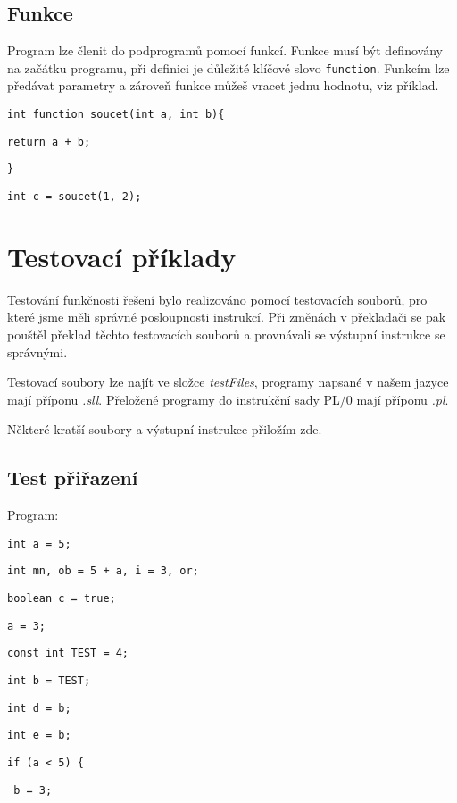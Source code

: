 \documentclass[czech]{thesiskiv}
\begin{document}
\section{Funkce}
Program lze členit do podprogramů pomocí funkcí.
Funkce musí být definovány na začátku programu, při definici je důležité klíčové slovo
\texttt{function}. Funkcím lze předávat parametry a zároveň funkce můžeš vracet jednu hodnotu, viz příklad.


\texttt{int function soucet(int a, int b)\{}

\texttt{return a + b;}

\texttt{\}}


\texttt{int c = soucet(1, 2);}

               
\chapter{Testovací příklady}
Testování funkčnosti řešení bylo realizováno pomocí testovacích souborů, pro které jsme měli správné posloupnosti instrukcí.
Při změnách v překladači se pak pouštěl překlad těchto testovacích souborů a provnávali se výstupní instrukce se správnými.

\noindent Testovací soubory lze najít ve složce \textit{testFiles}, programy napsané v našem jazyce mají příponu \textit{.sll}.
Přeložené programy do instrukční sady PL/0 mají příponu \textit{.pl}.

\noindent Některé kratší soubory a výstupní instrukce přiložím zde.

\section{Test přiřazení}

Program:

\texttt{int a = 5;}

\texttt{int mn, ob = 5 + a, i = 3, or;}

\texttt{boolean c = true; }

\texttt{a = 3;}

\texttt{const int TEST = 4;}

\texttt{int b = TEST;}

\texttt{int d = b;}

\texttt{int e = b;}

\texttt{if (a < 5) \{ }

\texttt{    b = 3; }
    
\end{document}
